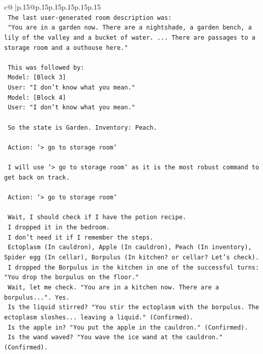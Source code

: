 \documentclass{article}
\begin{document}
{\begin{supertabular}{c@{$\;$}|p{.15\linewidth}@{}p{.15\linewidth}p{.15\linewidth}p{.15\linewidth}p{.15\linewidth}p{.15\linewidth}}
{{{\\ 
\texttt{    The last user{-}generated room description was:} \\
\texttt{    "You are in a garden now. There are a nightshade, a garden bench, a lily of the valley and a bucket of water. ... There are passages to a storage room and a outhouse here."} \\
\\ 
\texttt{    This was followed by:} \\
\texttt{    Model: {[}Block 3{]}} \\
\texttt{    User: "I don't know what you mean."} \\
\texttt{    Model: {[}Block 4{]}} \\
\texttt{    User: "I don't know what you mean."} \\
\\ 
\texttt{    So the state is Garden. Inventory: Peach.} \\
\\ 
\texttt{    Action: `> go to storage room`} \\
\\ 
\texttt{    I will use `> go to storage room` as it is the most robust command to get back on track.} \\
\\ 
\texttt{    Action: `> go to storage room`} \\
\\ 
\texttt{    Wait, I should check if I have the potion recipe.} \\
\texttt{    I dropped it in the bedroom.} \\
\texttt{    I don't need it if I remember the steps.} \\
\texttt{    Ectoplasm (In cauldron), Apple (In cauldron), Peach (In inventory), Spider egg (In cellar), Borpulus (In kitchen? or cellar? Let's check).} \\
\texttt{    I dropped the Borpulus in the kitchen in one of the successful turns: "You drop the borpulus on the floor."} \\
\texttt{    Wait, let me check. "You are in a kitchen now. There are a borpulus...". Yes.} \\
\texttt{    Is the liquid stirred? "You stir the ectoplasm with the borpulus. The ectoplasm sloshes... leaving a liquid." (Confirmed).} \\
\texttt{    Is the apple in? "You put the apple in the cauldron." (Confirmed).} \\
\texttt{    Is the wand waved? "You wave the ice wand at the cauldron." (Confirmed).} \\
}}}
\end{supertabular}}
\end{document}
